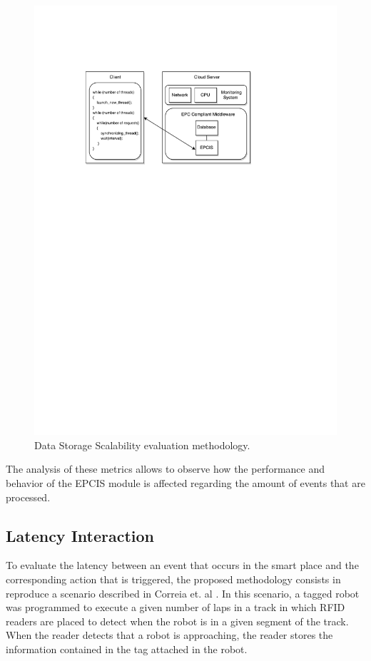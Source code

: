 \begin{figure}[h!]
  \centering
  \includegraphics[width=.7\textwidth]{./images/eval_data_methodology}
  \caption{Data Storage Scalability evaluation methodology.}
  \label{fig:eval_data_methodology}
\end{figure}

The analysis of these metrics allows to observe how the performance and behavior of the \gls{EPCIS}
module is affected regarding the amount of events that are processed.

\subsection{Latency Interaction}
\label{sub:eval_methodology_latency}
To evaluate the latency between an event that occurs in the smart place and the corresponding action
that is triggered, the proposed methodology consists in reproduce a scenario described in Correia et.
al \cite{Correia:Thesis:2014}. In this scenario, a tagged robot was programmed to execute a given number
of laps in a track in which \gls{RFID} readers are placed to detect when the robot is in a given
segment of the track. When the reader detects that a robot is approaching, the reader stores the information
contained in the tag attached in the robot.\\

